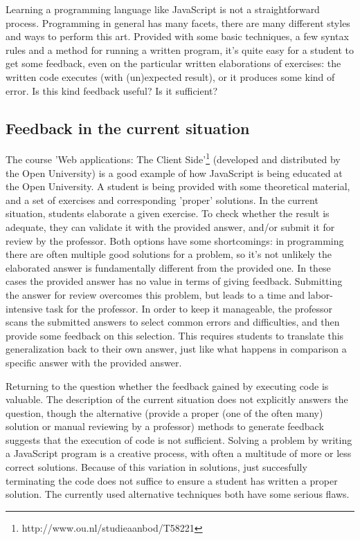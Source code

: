 \documentclass{article}
\begin{document}
Learning a programming language like JavaScript is not a straightforward
process. Programming in general has many facets, there are many different
styles and ways to perform this art. Provided with some basic techniques, a few
syntax rules and a method for running a written program, it's quite easy for a
student to get some feedback, even on the particular written elaborations of
exercises: the written code executes (with (un)expected result), or it produces
some kind of error. Is this kind feedback useful? Is it sufficient?

\subsection{Feedback in the current situation} 

The course 'Web applications: The Client
Side'\footnote{http://www.ou.nl/studieaanbod/T58221} (developed and distributed
by the Open University) is a good example of how JavaScript is being educated
at the Open University. A student is being provided with some theoretical
material, and a set of exercises and corresponding 'proper' solutions. In the
current situation, students elaborate a given exercise. To check whether the
result is adequate, they can validate it with the provided answer, and/or
submit it for review by the professor. Both options have some shortcomings: in
programming there are often multiple good solutions for a problem, so it’s not
unlikely the elaborated answer is fundamentally different from the provided
one. In these cases the provided answer has no value in terms of giving
feedback. Submitting the answer for review overcomes this problem, but leads to
a time and labor-intensive task for the professor. In order to keep it
manageable, the professor scans the submitted answers to select common errors
and difficulties, and then provide some feedback on this selection. This
requires students to translate this generalization back to their own answer,
just like what happens in comparison a specific answer with the provided
answer.

Returning to the question whether the feedback gained by executing code is 
valuable. The description of the current situation does not explicitly answers 
the question, though the alternative (provide a proper (one of the often 
many) solution or manual reviewing by a professor) methods to generate
feedback suggests that the execution of code is not sufficient. 
Solving a problem by writing a JavaScript program is a creative process, 
with often a multitude of more or less correct solutions. Because of 
this variation in solutions, just succesfully terminating the code does 
not suffice to ensure a student has written a proper solution. 
The currently used alternative techniques both have some serious flaws. 
\end{document}
